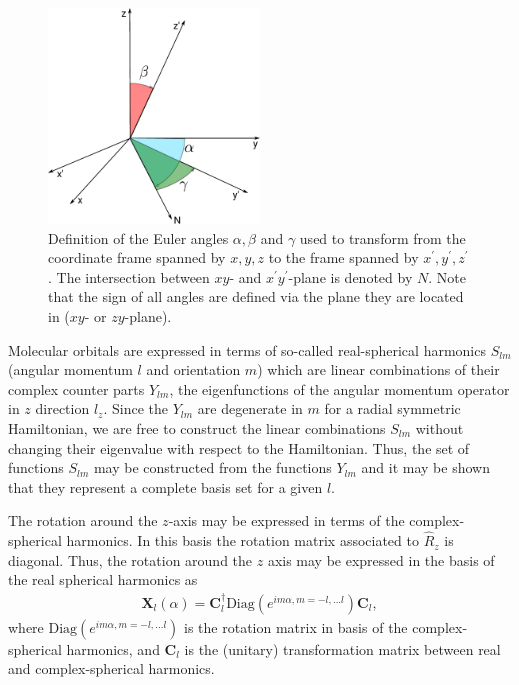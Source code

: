 \begin{figure}
  \centering
  \includegraphics[width = 0.5\textwidth]{figs/eulerAnglesDefinition.pdf}
  \caption{Definition of the Euler angles $\alpha,\beta$ and $\gamma$ used to transform from the coordinate
           frame spanned by $x,y,z$ to the frame spanned by $x^\prime,y^\prime,z^\prime$. The intersection
           between $xy$- and $x^\prime y^\prime $-plane is denoted by $N$. Note that the sign of all angles
           are defined via the plane they are located in ($xy$- or $zy$-plane).}
  \label{fig:EulerAnglesDefinition}
\end{figure}

Molecular orbitals are expressed in terms of so-called real-spherical harmonics $S_{lm}$ (angular momentum $l$
and orientation $m$) which are linear combinations of their complex counter parts $Y_{lm}$, the eigenfunctions
of the angular momentum operator in $z$ direction $\hat{l}_z$. Since the $Y_{lm}$ are degenerate in $m$ for a
radial symmetric Hamiltonian, we are free to construct the linear combinations $S_{lm}$ without changing their
eigenvalue with respect to the Hamiltonian. Thus, the set of functions $S_{lm}$ may be constructed from the
functions $Y_{lm}$ and it may be shown that they represent a complete basis set for a given $l$\cite{Blanco1997}.

The rotation around the $z$-axis may be expressed in terms of the complex-spherical harmonics. In this basis
the rotation matrix associated to $\hat{R}_z$ is diagonal. Thus, the rotation around the $z$ axis may be
expressed in the basis of the real spherical harmonics as
\begin{align}
  \pmb{X}_l(\alpha) = \pmb{C}_l^\dagger \mathrm{Diag}(e^{im\alpha,m=-l,...l})\pmb{C}_l,
\end{align}
where $\mathrm{Diag}(e^{im\alpha,m=-l,...l})$ is the rotation matrix in basis of the complex-spherical harmonics,
and $\pmb{C}_l$ is the (unitary) transformation matrix between real and complex-spherical harmonics.

